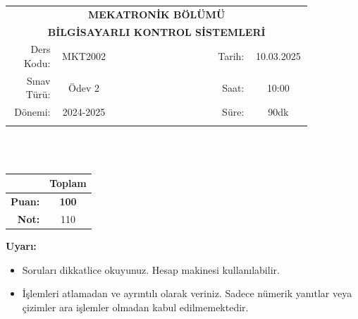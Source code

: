 \newcommand\UniversiteAdi{Niğde Ömer Halisdemir Üniversitesi}
\newcommand\BolumAdi{MEKATRONİK BÖLÜMÜ}
\newcommand\DersKodu{MKT2002}
\newcommand\DersAdi{BİLGİSAYARLI KONTROL SİSTEMLERİ}
\newcommand\SinavAdi{Ödev 2}
\newcommand\SinavTarihi{10.03.2025}
\newcommand\SinavSaati{10:00}
\newcommand\SinavSuresi{90dk}

\pagestyle{fancy}
\fancyhf{} %
\noindent
\begin{tabular}{
    p{0.15\linewidth}
    p{0.15\linewidth}
    p{0.3\linewidth}
    p{0.1\linewidth}
    p{0.15\linewidth}}
    \multicolumn{5}{c}{\textbf{\BolumAdi}}\\
    \multicolumn{5}{c}{\textbf{\DersAdi}}\\\hline
    \multicolumn{1}{|r|}{Ders Kodu:}&
    \multicolumn{1}{|c|}{\DersKodu}&
    \multicolumn{1}{|c|}{}& 
    \multicolumn{1}{|r|}{Tarih:}&
    \multicolumn{1}{|c|}{\SinavTarihi} \\\hline
    \multicolumn{1}{|r|}{Sınav Türü:}&
    \multicolumn{1}{|c|}{\SinavAdi}&  
    \multicolumn{1}{|c|}{}&
    \multicolumn{1}{|r|}{Saat:}&
    \multicolumn{1}{|c|}{\SinavSaati}\\\hline
    \multicolumn{1}{|r|}{Dönemi:}&
    \multicolumn{1}{|c|}{2024-2025}&
    \multicolumn{1}{|c|}{}&
    \multicolumn{1}{|r|}{Süre:}&
    \multicolumn{1}{|c|}{\SinavSuresi} \\\hline
    &&&&\\
\end{tabular}\\\\
\noindent\begin{center}
\begin{tabular}{|r|c|}\hline
    &\textbf{Toplam}\\\hline
    \textbf{Puan:} &\textbf{100}\\\hline
    \textbf{Not:}  &110\\\hline
\end{tabular}\end{center}
\noindent\textbf{Uyarı:}
\begin{itemize}\bfseries
    \item Soruları dikkatlice okuyunuz. Hesap makinesi kullanılabilir.
    \item İşlemleri atlamadan ve ayrıntılı olarak veriniz. Sadece nümerik yanıtlar veya çizimler ara işlemler olmadan kabul edilmemektedir.
\end{itemize}
